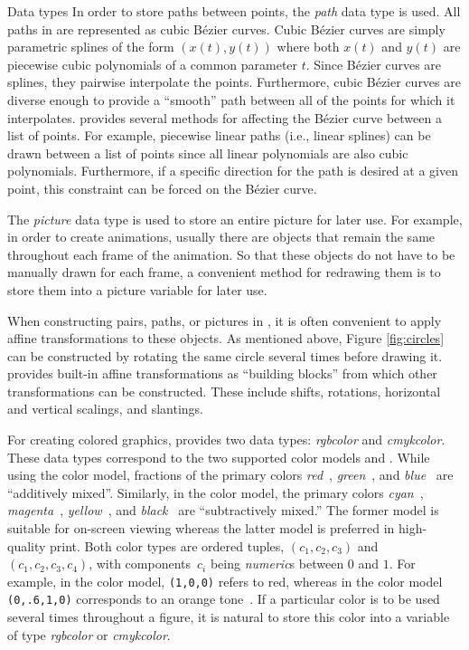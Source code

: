 \begin{section}{Data types}
In order to store paths between points, the \textit{path} data type is
used.  All paths in \MP{} are represented as cubic B\'{e}zier curves.
Cubic B\'{e}zier curves are simply parametric splines of the form
$(x(t),y(t))$ where both $x(t)$ and $y(t)$ are piecewise cubic
polynomials of a common parameter $t$.  Since B\'{e}zier curves are
splines, they pairwise interpolate the points.  Furthermore, cubic
B\'{e}zier curves are diverse enough to provide a ``smooth'' path
between all of the points for which it interpolates.  \MP{} provides
several methods for affecting the B\'{e}zier curve between a list of
points.  For example, piecewise linear paths (i.e., linear splines) can
be drawn between a list of points since all linear polynomials are also
cubic polynomials.  Furthermore, if a specific direction for the path is
desired at a given point, this constraint can be forced on the
B\'{e}zier curve.

The \textit{picture} data type is used to store an entire picture for
later use.  For example, in order to create animations, usually there
are objects that remain the same throughout each frame of the animation.
So that these objects do not have to be manually drawn for each frame, a
convenient method for redrawing them is to store them into a picture
variable for later use.

When constructing pairs, paths, or pictures in \MP{}, it is often
convenient to apply affine transformations to these objects.  As
mentioned above, Figure \ref{fig:circles} can be constructed by rotating
the same circle several times before drawing it.  \MP{} provides
built-in affine transformations as ``building blocks'' from which other
transformations can be constructed.  These include shifts, rotations,
horizontal and vertical scalings, and slantings.

For creating colored graphics, \MP{} provides two data types:
\textit{rgbcolor} and \textit{cmykcolor}.  These data types correspond
to the two supported color models \RGB{} and \CMYK.  While using the
\RGB{} color model, fractions of the primary colors
\textit{red}~, \textit{green}~, and
\textit{blue}~ are ``additively mixed''.  Similarly, in
the \CMYK{} color model, the primary colors
\textit{cyan}~, \textit{magenta}~,
\textit{yellow}~, and \textit{black}~ are
``subtractively mixed.''  The former model is suitable for on-screen
viewing whereas the latter model is preferred in high-quality print.
Both color types are ordered tuples, $(c_1,c_2,c_3)$ and
$(c_1,c_2,c_3,c_4)$, with components~$c_i$ being \textit{numeric}s
between $0$ and $1$.  For example, in the \RGB{} color model,
\texttt{(1,0,0)} refers to red, whereas in the \CMYK{} color model
\texttt{(0,.6,1,0)} corresponds to an orange
tone~.  If a particular color is to be used
several times throughout a figure, it is natural to store this color
into a variable of type \textit{rgbcolor} or \textit{cmykcolor}.


\end{section}
